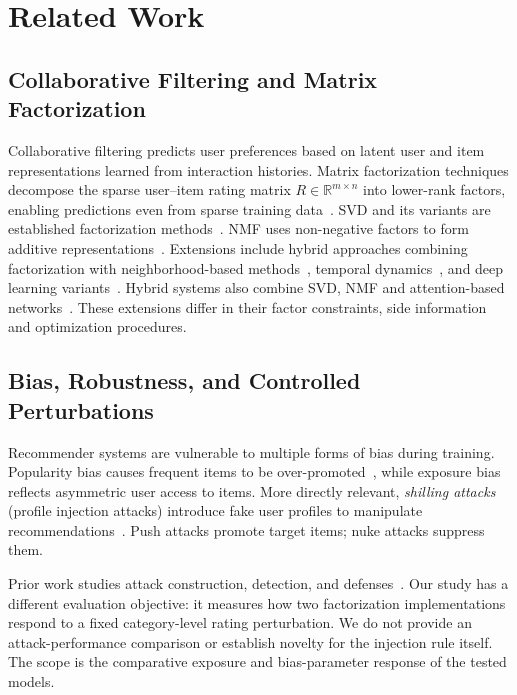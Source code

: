 \documentclass[information,article,submit,pdftex,moreauthors]{Definitions/mdpi}
\newif\ifrevisionnotes
\newcommand{\saracomment}[1]{\ifrevisionnotes\par\smallskip\noindent\textcolor{orange}{\textbf{Sara:} #1}\par\smallskip\fi}
\begin{document}
\section{Related Work}
\label{sec:related}

\subsection{Collaborative Filtering and Matrix Factorization}

Collaborative filtering predicts user preferences based on latent user and item representations learned from interaction histories. Matrix factorization techniques decompose the sparse user–item rating matrix $R \in \mathbb{R}^{m \times n}$ into lower-rank factors, enabling predictions even from sparse training data~\cite{ZHOU2015717, bahrkazemi2022optimal}. SVD and its variants are established factorization methods~\cite{repec:spr:elcore:v:23:y:2023:i:2:d:10.1007_s10660-021-09488-7}. NMF uses non-negative factors to form additive representations~\cite{NMF}. Extensions include hybrid approaches combining factorization with neighborhood-based methods~\cite{hssina2021recommendation}, temporal dynamics~\cite{behera2023collaborative}, and deep learning variants~\cite{li2023deep}. Hybrid systems also combine SVD, NMF and attention-based networks~\cite{haque2025hybrid}. These extensions differ in their factor constraints, side information and optimization procedures. 

\saracomment{Revised the related-work framing and acknowledged established profile-injection research. No superiority over existing attack methods is claimed.}

\subsection{Bias, Robustness, and Controlled Perturbations}

Recommender systems are vulnerable to multiple forms of bias during training. Popularity bias causes frequent items to be over-promoted~\cite{klimashevskaia2024survey}, while exposure bias reflects asymmetric user access to items. More directly relevant, \emph{shilling attacks} (profile injection attacks) introduce fake user profiles to manipulate recommendations~\cite{liu2025novel, nawara2024shilling, zayed2023experimental}. Push attacks promote target items; nuke attacks suppress them.

Prior work studies attack construction, detection, and defenses~\cite{li2016data,wang2024poisoning,nguyen2024manipulating}. Our study has a different evaluation objective: it measures how two factorization implementations respond to a fixed category-level rating perturbation. We do not provide an attack-performance comparison or establish novelty for the injection rule itself. The scope is the comparative exposure and bias-parameter response of the tested models.
\end{document}
